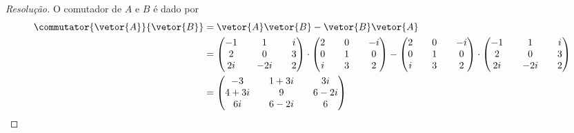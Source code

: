 \begin{proof}[Resolução]
    O comutador de \(A\) e \(B\) é dado por
    \begin{align*}
        \commutator{\vetor{A}}{\vetor{B}} &= \vetor{A} \vetor{B} - \vetor{B} \vetor{A}\\
                                          &= \begin{pmatrix}
                                                -1 && 1 && i\\
                                                2 && 0 && 3\\
                                                2i &&-2i&& 2
                                            \end{pmatrix}
                                            \cdot
                                            \begin{pmatrix}
                                                2 && 0 &&-i\\
                                                0 && 1 && 0\\
                                                i && 3 && 2
                                            \end{pmatrix}-
                                            \begin{pmatrix}
                                                2 && 0 &&-i\\
                                                0 && 1 && 0\\
                                                i && 3 && 2
                                            \end{pmatrix}
                                            \cdot
                                            \begin{pmatrix}
                                                -1 && 1 && i\\
                                                2 && 0 && 3\\
                                                2i &&-2i&& 2
                                            \end{pmatrix}\\
                                          &= \begin{pmatrix}
                                              -3 && 1+3i && 3i\\
                                              4 + 3i && 9 && 6 - 2i\\
                                              6i && 6 - 2i && 6

\end{pmatrix}
\end{align*}
\end{proof}
